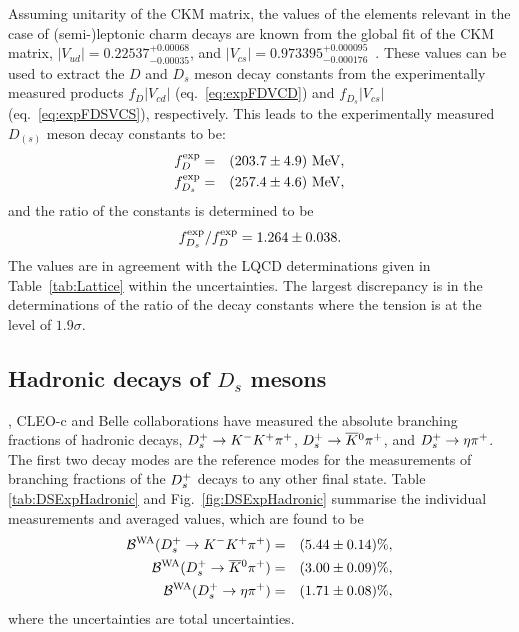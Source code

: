 Assuming unitarity of the CKM matrix, the values of the elements relevant in the case of \mbox{(semi-)leptonic} charm decays are known from the global fit
of the CKM matrix, $|V_{ud}|=0.22537^{+0.00068}_{-0.00035}$, and $|V_{cs}|=0.973395^{+0.000095}_{-0.000176}$~\cite{PDG_2014}. These values can be used to extract
the $D$ and $D_s$ meson decay constants from the experimentally measured products $f_{D}|V_{cd}|$ (eq.~\ref{eq:expFDVCD}) and $f_{D_s}|V_{cs}|$ (eq.~\ref{eq:expFDSVCS}),
respectively. This leads to the experimentally measured $D_{(s)}$ meson decay constants to be:
\begin{eqnarray}
f_D^{\rm exp} & = & (203.7\pm4.9)~{\rm MeV,}\nonumber\\ 
f_{D_s}^{\rm exp} & = & (257.4\pm4.6)~{\rm MeV,}\nonumber
\end{eqnarray}
and the ratio of the constants is determined to be
\[
f_{D_s}^{\rm exp}/f_D^{\rm exp} = 1.264\pm0.038.
\]
The values are in agreement with the LQCD determinations given in Table~\ref{tab:Lattice} within the uncertainties. The largest discrepancy is in the determinations of 
the ratio of the decay constants where the tension is at the level of $1.9\sigma$.


\clearpage
\subsection{Hadronic decays of $D_s$ mesons}

\babar, CLEO-c and Belle collaborations have measured the absolute branching fractions of hadronic decays, $D_{s}^+\to K^-K^+\pi^+$, $D_{s}^+\to \overline{K}{}^0\pi^+$, and $D_{s}^+ \to \eta\pi^+$. The first two 
decay modes are the reference modes for the measurements of branching fractions of the $D_{s}^+$ decays to any other final state. Table \ref{tab:DSExpHadronic} and 
Fig.~\ref{fig:DSExpHadronic} summarise the individual measurements and averaged values, which are found to be 
\begin{eqnarray}
{\cal B}^{\rm WA}(D_{s}^+\to K^-K^+\pi^+) & = & (5.44\pm0.14)\%,\\
{\cal B}^{\rm WA}(D_{s}^+\to \overline{K}{}^0\pi^+) & = & (3.00\pm0.09)\%,\\
{\cal B}^{\rm WA}(D_{s}^+\to \eta\pi^+) & = & (1.71\pm0.08)\%,
\end{eqnarray}
where the uncertainties are total uncertainties. 

